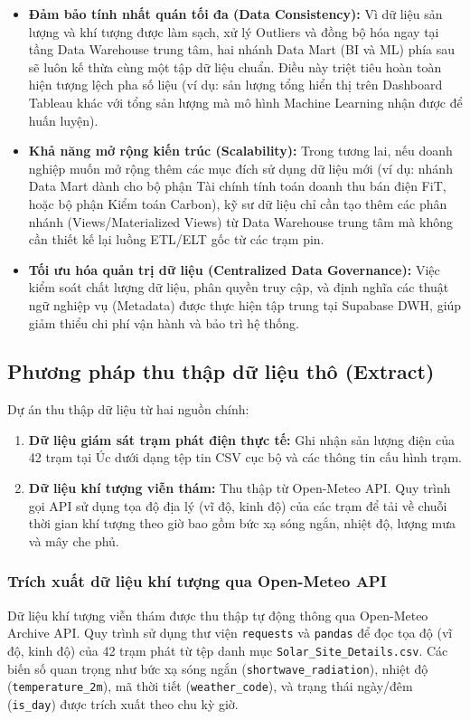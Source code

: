 \documentclass[12pt,a4paper]{article}
\begin{document}
\begin{itemize}
    \item \textbf{Đảm bảo tính nhất quán tối đa (Data Consistency):} Vì dữ liệu sản lượng và khí tượng được làm sạch, xử lý Outliers và đồng bộ hóa ngay tại tầng Data Warehouse trung tâm, hai nhánh Data Mart (BI và ML) phía sau sẽ luôn kế thừa cùng một tập dữ liệu chuẩn. Điều này triệt tiêu hoàn toàn hiện tượng lệch pha số liệu (ví dụ: sản lượng tổng hiển thị trên Dashboard Tableau khác với tổng sản lượng mà mô hình Machine Learning nhận được để huấn luyện).
    \item \textbf{Khả năng mở rộng kiến trúc (Scalability):} Trong tương lai, nếu doanh nghiệp muốn mở rộng thêm các mục đích sử dụng dữ liệu mới (ví dụ: nhánh Data Mart dành cho bộ phận Tài chính tính toán doanh thu bán điện FiT, hoặc bộ phận Kiểm toán Carbon), kỹ sư dữ liệu chỉ cần tạo thêm các phân nhánh (Views/Materialized Views) từ Data Warehouse trung tâm mà không cần thiết kế lại luồng ETL/ELT gốc từ các trạm pin.
    \item \textbf{Tối ưu hóa quản trị dữ liệu (Centralized Data Governance):} Việc kiểm soát chất lượng dữ liệu, phân quyền truy cập, và định nghĩa các thuật ngữ nghiệp vụ (Metadata) được thực hiện tập trung tại Supabase DWH, giúp giảm thiểu chi phí vận hành và bảo trì hệ thống.
\end{itemize}

\subsection{Phương pháp thu thập dữ liệu thô (Extract)}
\label{sec:datannguon}

Dự án thu thập dữ liệu từ hai nguồn chính:
\begin{enumerate}
    \item \textbf{Dữ liệu giám sát trạm phát điện thực tế:} Ghi nhận sản lượng điện của 42 trạm tại Úc dưới dạng tệp tin CSV cục bộ và các thông tin cấu hình trạm.
    \item \textbf{Dữ liệu khí tượng viễn thám:} Thu thập từ Open-Meteo API. Quy trình gọi API sử dụng tọa độ địa lý (vĩ độ, kinh độ) của các trạm để tải về chuỗi thời gian khí tượng theo giờ bao gồm bức xạ sóng ngắn, nhiệt độ, lượng mưa và mây che phủ.
\end{enumerate}

\subsubsection{Trích xuất dữ liệu khí tượng qua Open-Meteo API}
Dữ liệu khí tượng viễn thám được thu thập tự động thông qua Open-Meteo Archive API. Quy trình sử dụng thư viện \texttt{requests} và \texttt{pandas} để đọc tọa độ (vĩ độ, kinh độ) của 42 trạm phát từ tệp danh mục \texttt{Solar\_Site\_Details.csv}. Các biến số quan trọng như bức xạ sóng ngắn (\texttt{shortwave\_radiation}), nhiệt độ (\texttt{temperature\_2m}), mã thời tiết (\texttt{weather\_code}), và trạng thái ngày/đêm (\texttt{is\_day}) được trích xuất theo chu kỳ giờ.
\end{document}
